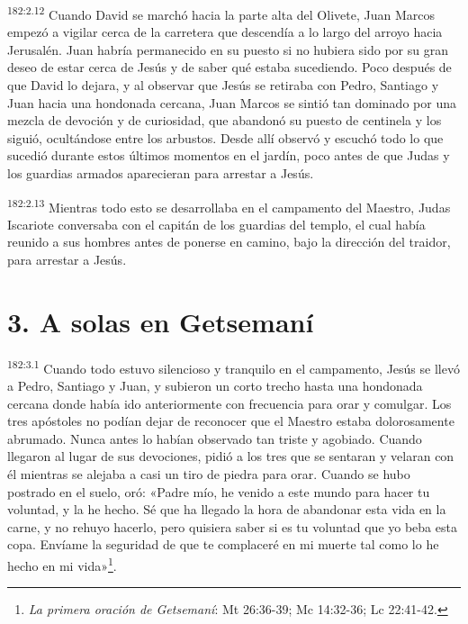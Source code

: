 \par 
\textsuperscript{182:2.12} Cuando David se marchó hacia la parte alta del Olivete, Juan Marcos empezó a vigilar cerca de la carretera que descendía a lo largo del arroyo hacia Jerusalén. Juan habría permanecido en su puesto si no hubiera sido por su gran deseo de estar cerca de Jesús y de saber qué estaba sucediendo. Poco después de que David lo dejara, y al observar que Jesús se retiraba con Pedro, Santiago y Juan hacia una hondonada cercana, Juan Marcos se sintió tan dominado por una mezcla de devoción y de curiosidad, que abandonó su puesto de centinela y los siguió, ocultándose entre los arbustos. Desde allí observó y escuchó todo lo que sucedió durante estos últimos momentos en el jardín, poco antes de que Judas y los guardias armados aparecieran para arrestar a Jesús.

\par 
\textsuperscript{182:2.13} Mientras todo esto se desarrollaba en el campamento del Maestro, Judas Iscariote conversaba con el capitán de los guardias del templo, el cual había reunido a sus hombres antes de ponerse en camino, bajo la dirección del traidor, para arrestar a Jesús.

\section*{3. A solas en Getsemaní}
\par 
\textsuperscript{182:3.1} Cuando todo estuvo silencioso y tranquilo en el campamento, Jesús se llevó a Pedro, Santiago y Juan, y subieron un corto trecho hasta una hondonada cercana donde había ido anteriormente con frecuencia para orar y comulgar. Los tres apóstoles no podían dejar de reconocer que el Maestro estaba dolorosamente abrumado. Nunca antes lo habían observado tan triste y agobiado. Cuando llegaron al lugar de sus devociones, pidió a los tres que se sentaran y velaran con él mientras se alejaba a casi un tiro de piedra para orar. Cuando se hubo postrado en el suelo, oró: «Padre mío, he venido a este mundo para hacer tu voluntad, y la he hecho. Sé que ha llegado la hora de abandonar esta vida en la carne, y no rehuyo hacerlo, pero quisiera saber si es tu voluntad que yo beba esta copa. Envíame la seguridad de que te complaceré en mi muerte tal como lo he hecho en mi vida»\footnote{\textit{La primera oración de Getsemaní}: Mt 26:36-39; Mc 14:32-36; Lc 22:41-42.}.

